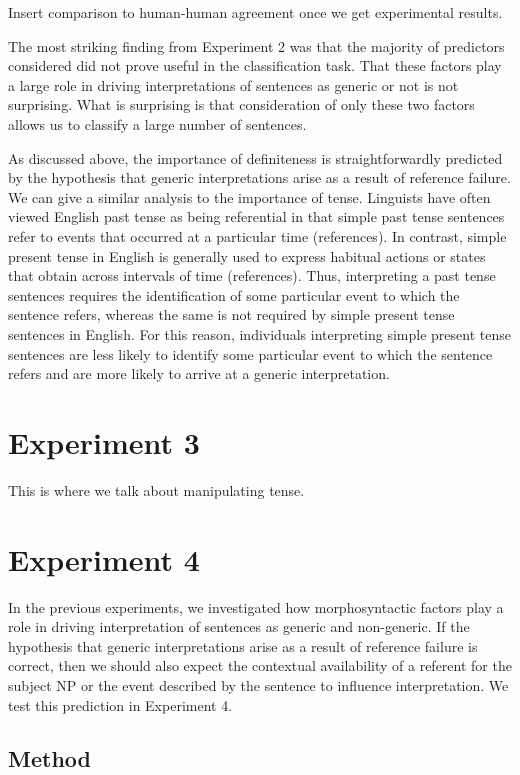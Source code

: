 \documentclass[10pt,letterpaper]{article}
\begin{document}
Insert comparison to human-human agreement once we get experimental results.

The most striking finding from Experiment 2 was that the majority of predictors considered did not prove useful in the classification task. That these factors play a large role in driving interpretations of sentences as generic or not is not surprising. What is surprising is that consideration of only these two factors allows us to classify a large number of sentences. 

As discussed above, the importance of definiteness is straightforwardly predicted by the hypothesis that generic interpretations arise as a result of reference failure. We can give a similar analysis to the importance of tense. Linguists have often viewed English past tense as being referential in that simple past tense sentences refer to events that occurred at a particular time (references). In contrast, simple present tense in English is generally used to express habitual actions or states that obtain across intervals of time (references). Thus, interpreting a past tense sentences requires the identification of some particular event to which the sentence refers, whereas the same is not required by simple present tense sentences in English. For this reason, individuals interpreting simple present tense sentences are less likely to identify some particular event to which the sentence refers and are more likely to arrive at a generic interpretation.

\section{Experiment 3}

This is where we talk about manipulating tense.

\section{Experiment 4}

In the previous experiments, we investigated how morphosyntactic factors play a role in driving interpretation of sentences as generic and non-generic. If the hypothesis that generic interpretations arise as a result of reference failure is correct, then we should also expect the contextual availability of a referent for the subject NP or the event described by the sentence to influence interpretation. We test this prediction in Experiment 4.

\subsection{Method}
\end{document}
